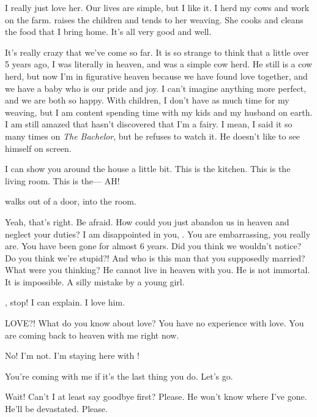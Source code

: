 \documentclass[letterpaper,12pt]{memoir}
\begin{document}
I really just love her. Our lives are simple, but I like it. I herd my cows and work on the farm. \zhinuname{} raises the children and tends to her weaving. She cooks and cleans the food that I bring home. It's all very good and well.

\zhinu%
It's really crazy that we've come so far. It is so strange to think that a little over 5 years ago, I was literally in heaven, and \niulangname{} was a simple cow herd. He still is a cow herd, but now I'm in figurative heaven because we have found love together, and we have a baby who is our pride and joy. I can't imagine anything more perfect, and we are both so happy. With children, I don't have as much time for my weaving, but I am content spending time with my kids and my husband on earth. I am still amazed that \niulangname{} hasn't discovered that I'm a fairy. I mean, I said it so many times on \textit{The Bachelor}, but he refuses to watch it. He doesn't like to see himself on screen.

I can show you around the house a little bit. This is the kitchen.  This is the living room.  This is the--- AH!\@

\begin{dida}
  \niangniangname{} walks out of a door, into the room.
\end{dida}

\niangniang%
Yeah, that's right. Be afraid. How could you just abandon us in heaven and neglect your duties?  I am disappointed in you, \zhinu. You are embarrassing, you really are. You have been gone for almost 6 years. Did you think we wouldn't notice? Do you think we're stupid?! And who is this man that you supposedly married? What were you thinking? He cannot live in heaven with you. He is not immortal. It is impossible. A silly mistake by a young girl.

\zhinu%
\niangniangname{}, stop! I can explain. I love him.

\niangniang%
LOVE?! What do you know about love? You have no experience with love. You are coming back to heaven with me right now.

\zhinu%
No! I'm not. I'm staying here with \niulangname{}!

\niangniang%
You're coming with me if it's the last thing you do. Let's go.

\zhinu%
Wait! Can't I at least say goodbye first? Please. He won't know where I've gone. He'll be devastated. Please.
\end{document}
